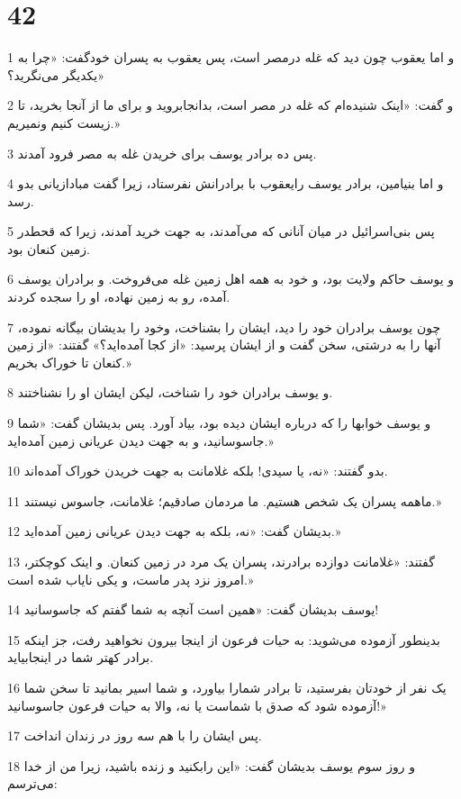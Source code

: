 \chapter{42}

\par 1 و اما یعقوب چون دید که غله درمصر است، پس یعقوب به پسران خودگفت: «چرا به یکدیگر می‌نگرید؟»
\par 2 و گفت: «اینک شنیده‌ام که غله در مصر است، بدانجابروید و برای ما از آنجا بخرید، تا زیست کنیم ونمیریم.»
\par 3 پس ده برادر یوسف برای خریدن غله به مصر فرود آمدند.
\par 4 و اما بنیامین، برادر یوسف رایعقوب با برادرانش نفرستاد، زیرا گفت مبادازیانی بدو رسد.
\par 5 پس بنی‌اسرائیل در میان آنانی که می‌آمدند، به جهت خرید آمدند، زیرا که قحطدر زمین کنعان بود.
\par 6 و یوسف حاکم ولایت بود، و خود به همه اهل زمین غله می‌فروخت. و برادران یوسف آمده، رو به زمین نهاده، او را سجده کردند.
\par 7 چون یوسف برادران خود را دید، ایشان را بشناخت، وخود را بدیشان بیگانه نموده، آنها را به درشتی، سخن گفت و از ایشان پرسید: «از کجا آمده‌اید؟» گفتند: «از زمین کنعان تا خوراک بخریم.»
\par 8 و یوسف برادران خود را شناخت، لیکن ایشان او را نشناختند.
\par 9 و یوسف خوابها را که درباره ایشان دیده بود، بیاد آورد. پس بدیشان گفت: «شما جاسوسانید، و به جهت دیدن عریانی زمین آمده‌اید.»
\par 10 بدو گفتند: «نه، یا سیدی! بلکه غلامانت به جهت خریدن خوراک آمده‌اند.
\par 11 ماهمه پسران یک شخص هستیم. ما مردمان صادقیم؛ غلامانت، جاسوس نیستند.»
\par 12 بدیشان گفت: «نه، بلکه به جهت دیدن عریانی زمین آمده‌اید.»
\par 13 گفتند: «غلامانت دوازده برادرند، پسران یک مرد در زمین کنعان. و اینک کوچکتر، امروز نزد پدر ماست، و یکی نایاب شده است.»
\par 14 یوسف بدیشان گفت: «همین است آنچه به شما گفتم که جاسوسانید!
\par 15 بدینطور آزموده می‌شوید: به حیات فرعون از اینجا بیرون نخواهید رفت، جز اینکه برادر کهتر شما در اینجابیاید.
\par 16 یک نفر از خودتان بفرستید، تا برادر شمارا بیاورد، و شما اسیر بمانید تا سخن شما آزموده شود که صدق با شماست یا نه، والا به حیات فرعون جاسوسانید!»
\par 17 پس ایشان را با هم سه روز در زندان انداخت.
\par 18 و روز سوم یوسف بدیشان گفت: «این رابکنید و زنده باشید، زیرا من از خدا می‌ترسم:
